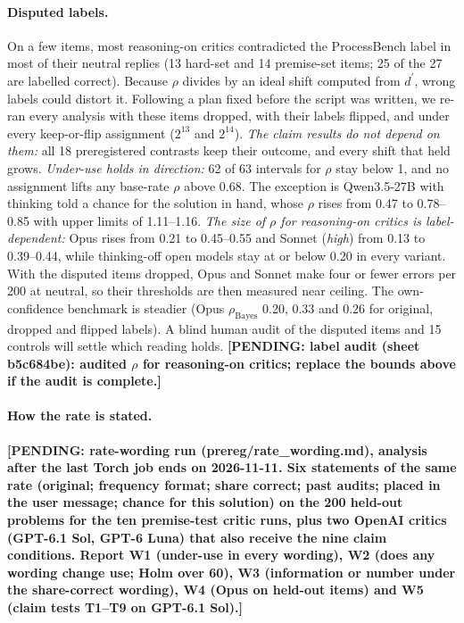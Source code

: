 \documentclass[letterpaper]{article} %
\newcommand{\pending}[1]{\textbf{[PENDING: #1]}}
\newcommand{\dprime}{d^{\prime}}
\begin{document}
\paragraph{Disputed labels.} On a few items, most reasoning-on critics contradicted the ProcessBench label in most of their neutral replies (13 hard-set and 14 premise-set items; 25 of the 27 are labelled correct). Because $\rho$ divides by an ideal shift computed from $\dprime$, wrong labels could distort it. Following a plan fixed before the script was written, we re-ran every analysis with these items dropped, with their labels flipped, and under every keep-or-flip assignment ($2^{13}$ and $2^{14}$). \emph{The claim results do not depend on them:} all 18 preregistered contrasts keep their outcome, and every shift that held grows. \emph{Under-use holds in direction:} 62 of 63 intervals for $\rho$ stay below 1, and no assignment lifts any base-rate $\rho$ above 0.68. The exception is Qwen3.5-27B with thinking told a chance for the solution in hand, whose $\rho$ rises from 0.47 to 0.78--0.85 with upper limits of 1.11--1.16. \emph{The size of $\rho$ for reasoning-on critics is label-dependent:} Opus rises from 0.21 to 0.45--0.55 and Sonnet (\emph{high}) from 0.13 to 0.39--0.44, while thinking-off open models stay at or below 0.20 in every variant. With the disputed items dropped, Opus and Sonnet make four or fewer errors per 200 at neutral, so their thresholds are then measured near ceiling. The own-confidence benchmark is steadier (Opus $\rho_{\mathrm{Bayes}}$ 0.20, 0.33 and 0.26 for original, dropped and flipped labels). A blind human audit of the disputed items and 15 controls will settle which reading holds. \pending{label audit (sheet b5c684be): audited $\rho$ for reasoning-on critics; replace the bounds above if the audit is complete.}

\paragraph{How the rate is stated.} \pending{rate-wording run (prereg/rate\_wording.md), analysis after the last Torch job ends on 2026-11-11. Six statements of the same rate (original; frequency format; share correct; past audits; placed in the user message; chance for this solution) on the 200 held-out problems for the ten premise-test critic runs, plus two OpenAI critics (GPT-6.1 Sol, GPT-6 Luna) that also receive the nine claim conditions. Report W1 (under-use in every wording), W2 (does any wording change use; Holm over 60), W3 (information or number under the share-correct wording), W4 (Opus on held-out items) and W5 (claim tests T1--T9 on GPT-6.1 Sol).}
\end{document}
